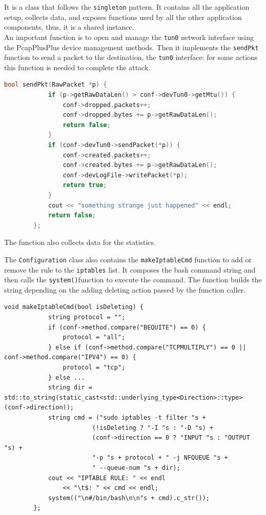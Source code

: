 \documentclass[12pt]{article}
\begin{document}
	It is a class that follows the \lstinline{singleton} pattern. It contains all the application setup, collects data, and exposes functions used by all the other application components, thus, it is a shared instance.\\
	\bigbreak
	An important function is to open and manage the \lstinline{tun0} network interface using the PcapPlusPlus device management methods. Then it implements the \lstinline{sendPkt} function to send a packet to the destination, the \lstinline{tun0} interface: for some actions this function is needed to complete the attack.\\
	
	\bigbreak

	\begin{lstlisting}[frame=single, language=C++]
		bool sendPkt(RawPacket *p) {
			if (p->getRawDataLen() > conf->devTun0->getMtu()) {
				conf->dropped.packets++;
				conf->dropped.bytes += p->getRawDataLen();
				return false;
			}
			if (conf->devTun0->sendPacket(*p)) {
				conf->created.packets++;
				conf->created.bytes += p->getRawDataLen();
				conf->devLogFile->writePacket(*p);
				return true;
			}
			cout << "something strange just happened" << endl;
			return false;
		};
	\end{lstlisting}
	\bigbreak
	The function also collects data for the statistics.
	\bigbreak

	The \lstinline{Configuration} class also contains the \lstinline{makeIptableCmd} function to add or remove the rule to the \lstinline{iptables} list. It composes the bash command string and then calls the \lstinline{system()}function to execute the command. The function builds the string depending on the adding deleting action passed by the function caller.\\
	
	\bigbreak

	\begin{lstlisting}[frame=single]
		void makeIptableCmd(bool isDeleting) {
			string protocol = "";
			if (conf->method.compare("BEQUITE") == 0) {
				protocol = "all";
			} else if (conf->method.compare("TCPMULTIPLY") == 0 || conf->method.compare("IPV4") == 0) {
				protocol = "tcp";
			} else ...
			string dir = std::to_string(static_cast<std::underlying_type<Direction>::type>(conf->direction));
			string cmd = ("sudo iptables -t filter "s +
						(!isDeleting ? "-I "s : "-D "s) +
						(conf->direction == 0 ? "INPUT "s : "OUTPUT "s) +
						"-p "s + protocol + " -j NFQUEUE "s +
						" --queue-num "s + dir);
			cout << "IPTABLE RULE: " << endl
				<< "\t$: " << cmd << endl;
			system(("\n#/bin/bash\n\n"s + cmd).c_str());
		};
	\end{lstlisting}
	\bigbreak
\end{document}
